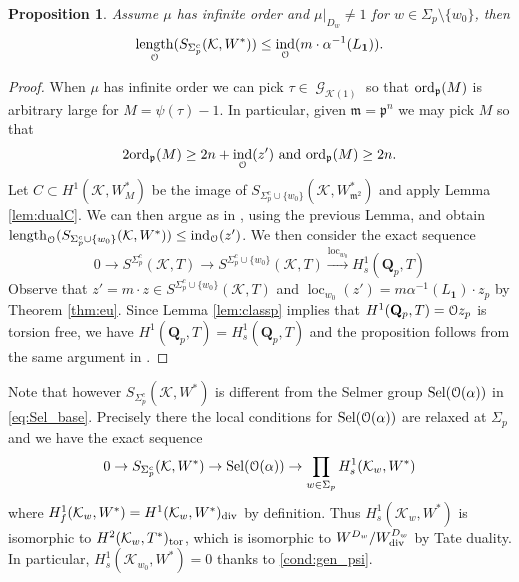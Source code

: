 \documentclass[leqno]{amsart}
\newtheorem{prop}[thm]{Proposition}
\theoremstyle{definition}
\theoremstyle{remark}
\newcommand{\id}{\mathbf{1}}
\newcommand{\eo}{\EuScript{O}}
\newcommand{\Qp}{\mathbf{Q}_p}
\DeclareMathOperator{\ind}{ind} %
\DeclareMathOperator{\length}{length}
\DeclareMathOperator{\Gal}{\mathcal{G}}
\newcommand{\fm}{\mathfrak{m}}
\newcommand{\fp}{\mathfrak{p}}
\newcommand{\K}{{\mathcal{K}}} %
\newcommand{\ord}{\textnormal{ord}} %
\DeclareMathOperator{\loc}{loc}
\DeclareMathOperator{\Sel}{Sel}
\begin{document}
\begin{prop}
    Assume $\mu$ has infinite order and $\mu\vert_{D_w}\neq 1$
    for $w\in\Sigma_p\setminus\{w_0\}$, then
    \[
    \length_\eo(S_{\Sigma_p^c}(\K,W^*))\leq \ind_{\eo}(m\cdot \alpha^{-1}(L_\id)).
    \]
\end{prop}
\begin{proof}
    When $\mu$ has infinite order we can pick $\tau\in \Gal_{\K(1)}$
    so that $\ord_\fp(M)$ is arbitrary large for $M=\psi(\tau)-1$.
    In particular, given $\fm=\fp^n$ we may pick $M$ so that 
    \[
         2\ord_\fp(M)\geq 2n+\ind_\eo(z')\text{ and }
         \ord_\fp(M)\geq 2n.
    \]
    Let $C\subset H^1(\K,W_M^*) $
    be the image of $S_{\Sigma_p^c\cup\{w_0\}}(\K,W_{\fm^2}^*)$
    and apply Lemma \ref{lem:dualC}.
    We can then argue as in \cite[p.114]{Rubin},
    using the previous Lemma, and obtain
    $\length_\eo(S_{\Sigma_p^c\cup \{w_0\}}(\K,W^*))\leq \ind_{\eo}(z')$.
    We then consider the exact sequence
    \[
    0\to S^{\Sigma_p^c}(\K, T)\to 
    S^{\Sigma_p^c\cup\{w_0\}}(\K, T)\xrightarrow{\loc_{w_0}}  
    H^1_s(\Qp,T)
    \]
    Observe that $z'=m\cdot z\in S^{\Sigma_p^c\cup\{w_0\}}(\K,T)$
    and $\loc_{w_0}(z')=m\alpha^{-1}(L_\id)\cdot z_p$
    by Theorem \ref{thm:eu}.
    Since Lemma \ref{lem:classp} implies that
    $H^1(\Qp,T)=\eo z_p$ is torsion free,
    we have $H^1(\Qp,T)=H^1_s(\Qp,T)$ and
    the proposition follows from the same argument in \cite[Thm 2.2.10]{Rubin}.
\end{proof}

Note that however $S_{\Sigma_p^c}(\K,W^*)$ is different
from the Selmer group $\Sel(\eo(\alpha))$ in \eqref{eq:Sel_base}.
Precisely there the local conditions for $\Sel(\eo(\alpha))$
are relaxed at $\Sigma_p$ and we have the exact sequence
\[
    0\to S_{\Sigma_p^c}(\K,W^*)\to 
    \Sel(\eo(\alpha))\to \prod_{w\in\Sigma_p}H^1_s(\K_w,W^*)
\]
where $H^1_f(\K_w,W^*)=H^1(\K_w,W^*)_{\textnormal{div}}$ by definition.
Thus $H^1_s(\K_w,W^*)$ is isomorphic to
$H^2(\K_w, T^*)_{\textnormal{tor}}$, which is isomorphic to
$W^{D_w}/W^{D_w}_{\textnormal{div}}$ by Tate duality.
In particular, $H^1_s(\K_{w_0},W^*)=0$ thanks to 
\eqref{cond:gen_psi}.
\end{document}
